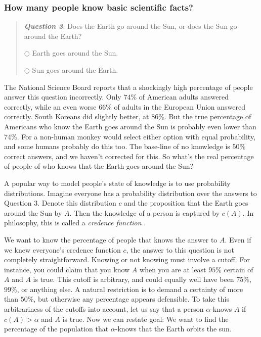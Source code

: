 \subsubsection{How many people know basic scientific facts?}
\begin{quote}
\textbf{\emph{Question 3}}: Does the Earth go around the Sun, or does
the Sun go around the Earth?

\medskip

$\bigcirc$ Earth goes around the Sun.

$\bigcirc$ Sun goes around the Earth.
\end{quote}
The National Science Board \citeyear[Table 7-8]{National_Science_Board2014-yl}
reports that a shockingly high percentage of people answer this question incorrectly. Only $74$\% of American adults answered correctly, while an even worse $66$\% of adults in the European Union answered correctly. South Koreans did slightly better, at $86$\%. But the true percentage of Americans who know the Earth goes around the Sun is probably even lower than $74$\%. For a non-human monkey would select either option with equal probability, and some humans probably do this too. The base-line of no knowledge is $50$\% correct answers, and we haven't corrected for this. So what's the real percentage of people of who knows that the Earth goes around the Sun? 

A popular way to model people's state of knowledge is to use probability distributions. Imagine everyone has a probability distribution over the answers to Question 3. Denote this distribution $c$ and the proposition that the Earth goes around the Sun by $A$. Then the knowledge of a person is captured by $c(A)$. In philosophy, this is called a \emph{credence function} \parencite{Pettigrew2019-rk}.

We want to know the percentage of people that knows the answer to $A$. Even if we knew everyone's credence function $c$, the answer to this question is not completely straightforward. Knowing or not knowing must involve a cutoff. For instance, you could claim that you know $A$ when you are at least $95\%$ certain of $A$ and $A$ is true. This cutoff is arbitrary, and could equally well have been $75\%$, $99\%$, or anything else. A natural restriction is to demand a certainty of more than $50\%$, but otherwise any percentage appears defensible. To take this arbitrariness of the cutoffs into account, let us say that a person $\alpha$-knows $A$ if $c(A)>\alpha$ and $A$ is true. Now we can restate goal: We want to find the percentage of the population that $\alpha$-knows that the Earth orbits the sun.

